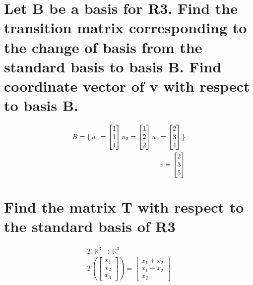 \documentclass{assignment}
\begin{document}
\section{Let B be a basis for R3. Find the transition matrix corresponding to the change of basis from the standard basis to basis B. Find coordinate vector of v with respect to basis B.}
\begin{align}
  B = \set{
    u_1 = \begin{bmatrix}
      1 \\
      1 \\
      1
    \end{bmatrix}
    u_2 = \begin{bmatrix}
      1 \\
      2 \\
      2
    \end{bmatrix}
    u_1 = \begin{bmatrix}
      2 \\
      3 \\
      4
    \end{bmatrix}} \\
  v = \begin{bmatrix}
    2 \\
    3 \\
    5
  \end{bmatrix}
\end{align}

\newpage

\section{Find the matrix T with respect to the standard basis of R3}
\begin{align}
  T: \mathbb{R}^3 \rightarrow \mathbb{R}^3 \\
  T\left(
  \begin{bmatrix}
    x_1 \\
    x_2 \\
    x_3
  \end{bmatrix}
  \right) = \begin{bmatrix}
      x_1 + x_2 \\
      x_1 - x_2 \\
      x_2
    \end{bmatrix}
\end{align}

\newpage
\end{document}
